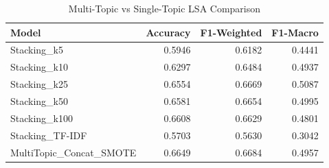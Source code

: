 \begin{table}[htbp]
\centering
\caption{Multi-Topic vs Single-Topic LSA Comparison}
\label{tab:table5}
\small
\begin{tabular}{lrrr}
\toprule
Model & Accuracy & F1-Weighted & F1-Macro \\
\midrule
Stacking_k5 & 0.5946 & 0.6182 & 0.4441 \\
Stacking_k10 & 0.6297 & 0.6484 & 0.4937 \\
Stacking_k25 & 0.6554 & 0.6669 & 0.5087 \\
Stacking_k50 & 0.6581 & 0.6654 & 0.4995 \\
Stacking_k100 & 0.6608 & 0.6629 & 0.4801 \\
Stacking_TF-IDF & 0.5703 & 0.5630 & 0.3042 \\
MultiTopic_Concat_SMOTE & 0.6649 & 0.6684 & 0.4957 \\
\bottomrule
\end{tabular}
\end{table}
